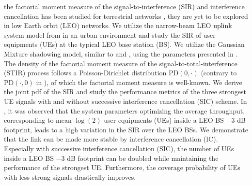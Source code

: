 \documentclass[lettersize,journal]{IEEEtran}
\begin{document}
 the factorial moment measure of the signal-to-interference (SIR)  and interference cancellation has been studied for terrestrial networks \cite{7305791}, they are yet to be explored in low Earth orbit (LEO) networks. We utilize the narrow-beam LEO uplink system model from \cite{10909705} in an urban environment and study the SIR of user equipments (UEs) at the typical LEO base station (BS). We utilize the Gaussian Mixture shadowing model, similar to \cite{modelinguplink} and \cite{9684552}, using the parameters presented in \cite{TR38.811}. The density of the factorial moment measure of the signal-to-total-interference (STIR) process follows a Poisson-Dirichlet distribution PD$(0,\cdot)$ (contrary to PD$(\cdot,0)$ in \cite{7305791}), of which the factorial moment measure is well-known. We derive the joint pdf of the SIR and study the performance metrics of the three strongest UE signals with and without successive interference cancellation (SIC) scheme. In \cite{10909705}, it was observed that the system parameters optimizing the average throughput, corresponding to mean $\log(2)$ user equipments (UEs) inside a LEO BS $-3$ dB footprint, leads to a high variation in the SIR over the LEO BSs. We demonstrate that the link can be made more stable by interference cancellation (IC). Especially with successive interference cancellation (SIC), the number of UEs inside a LEO BS $-3$ dB footprint can be doubled while maintaining the performance of the strongest UE. Furthermore, the coverage probability of UEs with less strong signals drastically improves.
\end{document}
